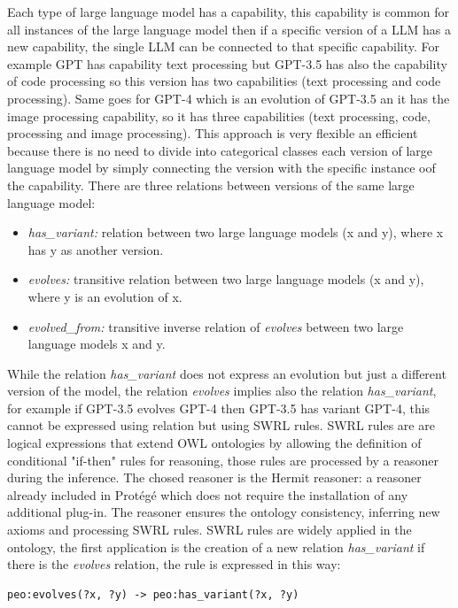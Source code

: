 Each type of large language model has a capability, this capability is common for all instances of the large language model then if a specific version of a LLM has a new capability, the single LLM can be connected to that specific capability. For example GPT has capability text processing but GPT-3.5 has also the capability of code processing so this version has two capabilities (text processing and code processing). Same goes for GPT-4 which is an evolution of GPT-3.5 an it has the image processing capability, so it has three capabilities (text processing, code, processing and image processing). This approach is very flexible an efficient because there is no need to divide into categorical classes each version of large language model by simply connecting the version with the specific instance oof the capability. There are three relations between versions of the same large language model: 
\begin{itemize}
    \item \textit{has\_variant:} relation between two large language models (x and y), where x has y as another version.

    \item \textit{evolves:} transitive relation between two large language models (x and y), where y is an evolution of x. 

    \item \textit{evolved\_from:} transitive inverse relation of \textit{evolves} between two large language models x and y.
\end{itemize}
While the relation \textit{has\_variant} does not express an evolution but just a different version of the model, the relation \textit{evolves} implies also the relation \textit{has\_variant}, for example if GPT-3.5 evolves GPT-4 then GPT-3.5 has variant GPT-4, this cannot be expressed using relation but using SWRL rules. SWRL rules are are logical expressions that extend OWL ontologies by allowing the definition of conditional "if-then" rules for reasoning, those rules are processed by a reasoner during the inference. The chosed reasoner is the Hermit reasoner\cite{glimm2014hermit}: a reasoner already included in Protégé which does not require the installation of any additional plug-in. The reasoner ensures the ontology consistency, inferring new axioms and processing SWRL rules. SWRL rules are widely applied in the ontology, the first application is the creation of a new relation \textit{has\_variant} if there is the \textit{evolves} relation, the rule is expressed in this way:
\begin{lstlisting}
peo:evolves(?x, ?y) -> peo:has_variant(?x, ?y)
\end{lstlisting}
